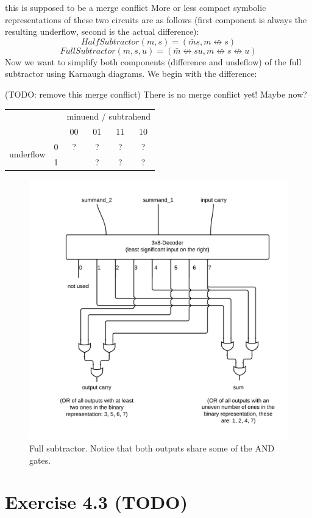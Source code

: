 \documentclass[10pt,a4paper]{scrartcl}
\newcommand{\subExercise}[1]{\vspace{0.5em} \noindent{\bf #1)}}
\begin{document}
this is supposed to be a merge conflict
\subExercise{b} 
More or less compact symbolic representations 
of these two circuits are as follows 
(first component is always the resulting underflow, 
 second is the actual difference):
\[
  HalfSubtractor(m,s) = (\bar m s, m \not\leftrightarrow s)
\]
\[
  FullSubtractor(m,s,u) = 
    (\bar m \not\leftrightarrow su, 
     m \not\leftrightarrow s \not\leftrightarrow u
    )
\]
\subExercise{c} 
Now we want to simplify both components (difference and undeflow) 
of the full subtractor using Karnaugh diagrams. We begin with the
difference:

(TODO: remove this merge conflict)
There is no merge conflict yet!
Maybe now?
\vspace{0.5em}
\begin{tabular}{|c c|c c c c|}
  \hline 
    & & \multicolumn{4}{c|}{minuend / subtrahend} \\
    & & 00 & 01 & 11 & 10 \\
  \hline
    \multirow{2}{*}{underflow} & 0 & ? & ? & ? & ? \\
                               & 1 & \cellcolor{red}{?} & ? & ? & ? \\
  \hline
\end{tabular}
 
\subExercise{d}
\vspace{1em}
\begin{figure}[h]
  \centering\includegraphics[width=0.6\linewidth]{images/fullAdder.png}
  \caption{Full subtractor. Notice that both outputs share some of the AND gates.}
\end{figure}
\vspace{1em}


\section*{Exercise 4.3 (TODO)}
\subExercise{a}
\subExercise{b}
\end{document}
